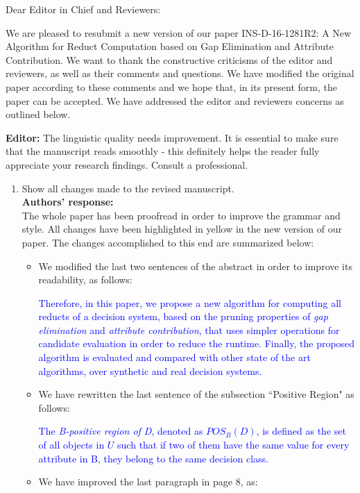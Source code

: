 \documentclass{letter}
\begin{document}
\begin{letter}{}
  \opening{Dear Editor in Chief and Reviewers:}

  We are pleased to resubmit a new version of our paper INS-D-16-1281R2: A New Algorithm for Reduct Computation based on Gap Elimination and Attribute Contribution. We want to thank the constructive criticisms of the editor and reviewers, as well as their comments and questions. We have modified the original paper according to these comments and we hope that, in its present form, the paper can be accepted. We have addressed the editor and reviewers concerns as outlined below.

  \textbf{Editor:} 
  The linguistic quality needs improvement. It is essential to make sure that  the manuscript reads smoothly - this definitely helps the reader fully appreciate your research findings. Consult a professional. 
  \begin{enumerate}
	\item Show all changes made to the revised manuscript. \\
	\textbf{Authors’ response:} \\
	The whole paper has been proofread in order to improve the grammar and style. All changes have been highlighted in yellow in the new version of our paper. The changes accomplished to this end are summarized below:
	\begin{itemize}		
		\item We modified the last two sentences of the abstract in order to improve its readability, as follows:
		
		\textcolor{blue}{Therefore, in this paper, we propose a new algorithm for computing all reducts of a decision system, based on the pruning properties of \textit{gap  elimination} and \textit{attribute contribution}, that uses simpler operations for candidate evaluation in order to reduce the runtime. Finally, the proposed algorithm is evaluated and compared with other state of the art algorithms, over synthetic and real decision systems.}
				 
		\item We have rewritten the last sentence of the subsection ``Positive Region" as follows:
		
	    \textcolor{blue}{The \textit{B-positive region of D}, denoted as $POS_B(D)$, is defined as the set of all objects in $U$ such that if two of them have the same value for every attribute in B, they belong to the same decision class.}
		
		\item We have improved the last paragraph in page 8, as:
		

\end{itemize}
\end{enumerate}
\end{letter}
\end{document}
